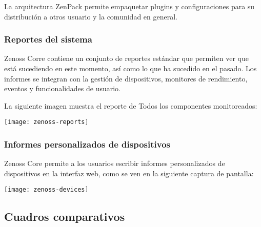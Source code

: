 La arquitectura ZenPack permite empaquetar plugins y configuraciones
para su distribución a otros usuario y la comunidad en general.

\subsubsection{Reportes del sistema}

Zenoss Corre contiene un conjunto de reportes estándar que permiten
ver que está sucediendo en este momento, así como lo que ha
sucedido en el pasado. Los informes se integran con la gestión de
dispositivos, monitores de rendimiento, eventos y funcionalidades de
usuario.

La siguiente imagen muestra el reporte de Todos los
componentes monitoreados: \\

\centerline{\texttt{[image: zenoss-reports]}}

\subsubsection{Informes personalizados de dispositivos}

Zenoss Core permite a los usuarios escribir informes personalizados de
dispositivos en la interfaz web, como se ven en la siguiente captura
de pantalla: \\

\centerline{\texttt{[image: zenoss-devices]}}

\clearpage

\subsection{Cuadros comparativos}

